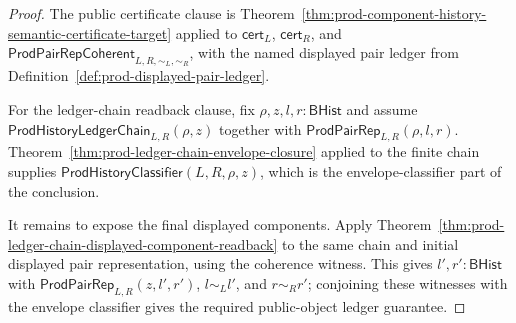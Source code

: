 \begin{proof}
The public certificate clause is
Theorem~\ref{thm:prod-component-history-semantic-certificate-target} applied to
$\mathsf{cert}_L$, $\mathsf{cert}_R$, and
$\mathsf{ProdPairRepCoherent}_{L,R,\sim_L,\sim_R}$, with the named displayed pair
ledger from Definition~\ref{def:prod-displayed-pair-ledger}.

For the ledger-chain readback clause, fix $\rho,z,l,r:\mathsf{BHist}$ and assume
$\mathsf{ProdHistoryLedgerChain}_{L,R}(\rho,z)$ together with
$\mathsf{ProdPairRep}_{L,R}(\rho,l,r)$. Theorem~\ref{thm:prod-ledger-chain-envelope-closure}
applied to the finite chain supplies
$\mathsf{ProdHistoryClassifier}(L,R,\rho,z)$, which is the envelope-classifier
part of the conclusion.

It remains to expose the final displayed components. Apply
Theorem~\ref{thm:prod-ledger-chain-displayed-component-readback} to the same chain
and initial displayed pair representation, using the coherence witness. This
gives $l',r':\mathsf{BHist}$ with
$\mathsf{ProdPairRep}_{L,R}(z,l',r')$, $l\sim_L l'$, and $r\sim_R r'$; conjoining
these witnesses with the envelope classifier gives the required public-object
ledger guarantee.
\end{proof}

